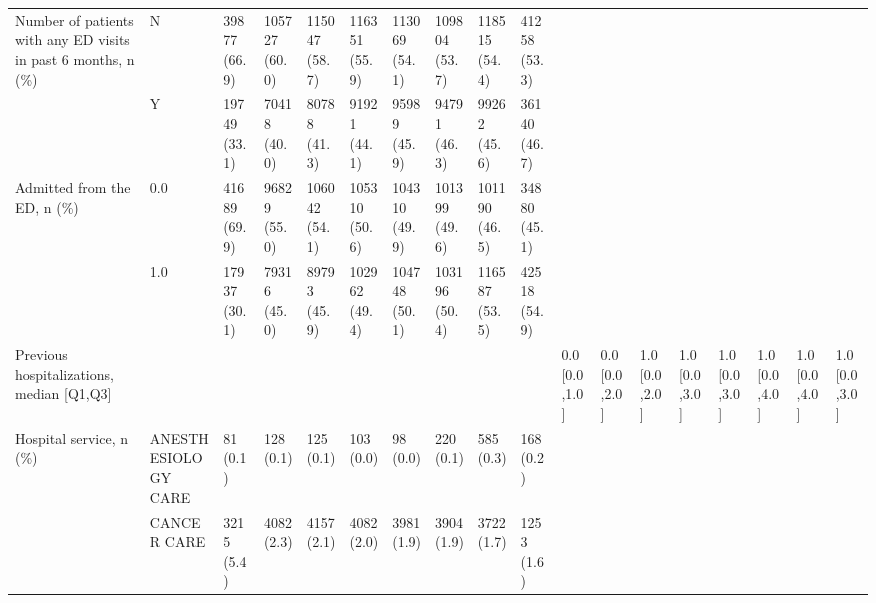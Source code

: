 \begin{tabular}{llllllllllllllllll}
Number of patients with any ED visits in past 6 months, n (\%) & N &                 39877 (66.9) &   105727 (60.0) &   115047 (58.7) &   116351 (55.9) &   113069 (54.1) &   109804 (53.7) &   118515 (54.4) &   41258 (53.3) &                   &                    &                    &                    &                    &                     &                     &                     \\
                                       & Y &                 19749 (33.1) &    70418 (40.0) &    80788 (41.3) &    91921 (44.1) &    95989 (45.9) &    94791 (46.3) &    99262 (45.6) &   36140 (46.7) &                   &                    &                    &                    &                    &                     &                     &                     \\
Admitted from the ED, n (\%) & 0.0 &                 41689 (69.9) &    96829 (55.0) &   106042 (54.1) &   105310 (50.6) &   104310 (49.9) &   101399 (49.6) &   101190 (46.5) &   34880 (45.1) &                   &                    &                    &                    &                    &                     &                     &                     \\
                                       & 1.0 &                 17937 (30.1) &    79316 (45.0) &    89793 (45.9) &   102962 (49.4) &   104748 (50.1) &   103196 (50.4) &   116587 (53.5) &   42518 (54.9) &                   &                    &                    &                    &                    &                     &                     &                     \\
Previous hospitalizations, median [Q1,Q3] &   &                              &                 &                 &                 &                 &                 &                 &                &     0.0 [0.0,1.0] &      0.0 [0.0,2.0] &      1.0 [0.0,2.0] &      1.0 [0.0,3.0] &      1.0 [0.0,3.0] &       1.0 [0.0,4.0] &       1.0 [0.0,4.0] &       1.0 [0.0,3.0] \\
Hospital service, n (\%) & ANESTHESIOLOGY CARE &                     81 (0.1) &       128 (0.1) &       125 (0.1) &       103 (0.0) &        98 (0.0) &       220 (0.1) &       585 (0.3) &      168 (0.2) &                   &                    &                    &                    &                    &                     &                     &                     \\
                                       & CANCER CARE &                   3215 (5.4) &      4082 (2.3) &      4157 (2.1) &      4082 (2.0) &      3981 (1.9) &      3904 (1.9) &      3722 (1.7) &     1253 (1.6) &                   &                    &                    &                    &                    &                     &                     &                     \\

\end{tabular}
